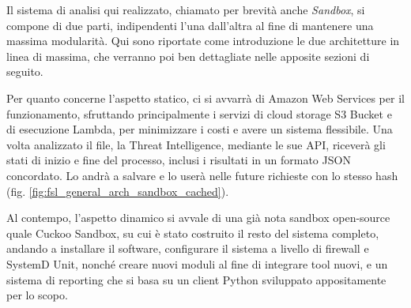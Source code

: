 Il sistema di analisi qui realizzato, chiamato per brevità anche \emph{Sandbox},
si compone di due parti, indipendenti l'una dall'altra al fine di mantenere una massima modularità.
Qui sono riportate come introduzione le due architetture in linea di massima, che verranno poi ben dettagliate nelle apposite sezioni di seguito.

Per quanto concerne l'aspetto statico, ci si avvarrà di Amazon Web Services per il funzionamento,
sfruttando principalmente i servizi di cloud storage S3 Bucket e di esecuzione Lambda, per minimizzare i costi e avere un sistema flessibile.
Una volta analizzato il file, la Threat Intelligence, mediante le sue API, riceverà gli stati di inizio e fine del processo, inclusi i risultati in un formato JSON concordato. Lo andrà a salvare e lo userà nelle future richieste con lo stesso hash (fig. \ref{fig:fsl_general_arch_sandbox_cached}).

Al contempo, l'aspetto dinamico si avvale di una già nota sandbox open-source quale Cuckoo Sandbox,
su cui è stato costruito il resto del sistema completo,
andando a installare il software, configurare il sistema a livello di firewall e SystemD Unit,
nonché creare nuovi moduli al fine di integrare tool nuovi, e un sistema di reporting che si basa su un client Python sviluppato appositamente per lo scopo.

